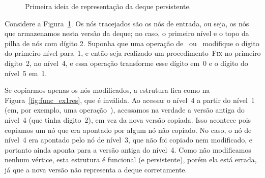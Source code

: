 \documentclass[main.tex]{subfiles}
\begin{document}
\begin{figure}[h]
\centering
{}
\caption{Primeira ideia de representação da deque persistente.} \label{fig:func_ex1}
\end{figure}

Considere a Figura~\ref{fig:func_ex1}. Os nós tracejados são os nós de entrada, ou seja, os nós que armazenamos nesta versão da deque; no caso, o primeiro nível e o topo da pilha de nós com dígito 2. Suponha que uma operação de~ ou~ modifique o dígito do primeiro nível para~1, e então seja realizado um procedimento~\textsc{Fix} no primeiro dígito~2, no nível~4, e essa operação transforme esse dígito em~0 e o dígito do nível~5 em~1.

Se copiarmos apenas os nós modificados, a estrutura fica como na Figura~\ref{fig:func_ex1res}, que é inválida. Ao acessar o nível~4 a partir do nível~1 (em, por exemplo, uma operação~), acessamos na verdade a versão antiga do nível~4 (que tinha dígito~2), em vez da nova versão copiada. Isso acontece pois copiamos um nó que era apontado por algum nó não copiado. No caso, o nó de nível~4 era apontado pelo nó de nível~3, que não foi copiado nem modificado, e portanto ainda aponta para a versão antiga do nível~4. Como não modificamos nenhum vértice, esta estrutura é funcional (e persistente), porém ela está errada, já que a nova versão não representa a deque corretamente.
\end{document}
